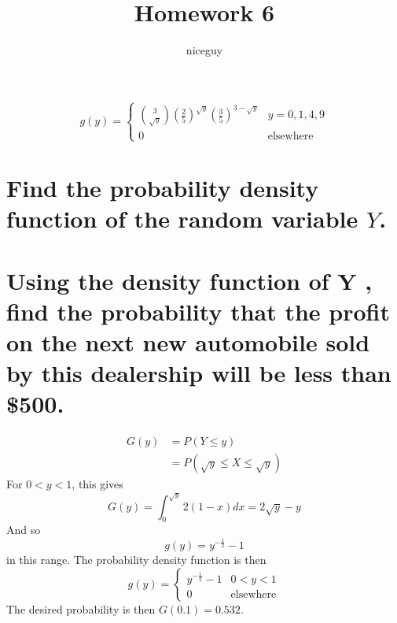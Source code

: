 \documentclass[answers]{exam}
\author{niceguy}
\title{Homework 6}
\begin{document}
\maketitle

\begin{questions}


\begin{solution}
	$$g(y) = \begin{cases} \binom{3}{\sqrt{y}} \left(\frac{2}{5}\right)^{\sqrt{y}} \left(\frac{3}{5}\right)^{3-\sqrt{y}} & y=0,1,4,9 \\ 0 & \text{elsewhere} \end{cases}$$
\end{solution}


\begin{parts}
	\part{Find the probability density function of the random variable $Y$.}
	\part{Using the density function of Y , find the probability that the profit on the next new automobile sold by this dealership will be less than \$500.}
\end{parts}

\begin{solution}
	\begin{align*}
		G(y) &= P(Y\leq y) \\
		     &= P(\sqrt{y} \leq X \leq \sqrt{y})
	\end{align*}
	For $0 < y < 1$, this gives
	$$G(y) = \int_0^{\sqrt{y}} 2(1-x)dx = 2\sqrt{y} - y$$
	And so
	$$g(y) = y^{-\frac{1}{2}} - 1$$
	in this range. The probability density function is then
	$$g(y) = \begin{cases} y^{-\frac{1}{2}} - 1 & 0 < y < 1 \\ 0 & \text{elsewhere} \end{cases}$$
	The desired probability is then $G(0.1) = 0.532$.
\end{solution}


\end{questions}
\end{document}
